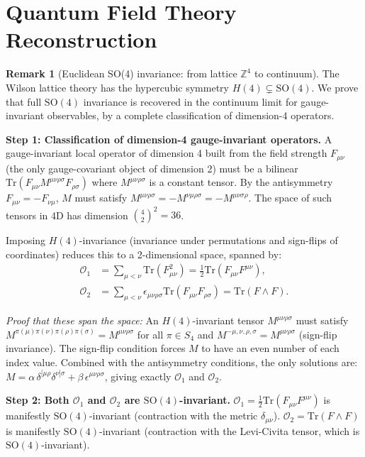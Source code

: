 \documentclass[11pt,a4paper]{amsart}
\theoremstyle{definition}
\newtheorem{remark}[theorem]{Remark}
\newcommand{\Z}{\mathbb{Z}}
\newcommand{\Tr}{\mathrm{Tr}}
\begin{document}
\section{Quantum Field Theory Reconstruction}
\label{sec:QFT_reconstruction}

\begin{remark}[Euclidean SO(4) invariance: from lattice $\Z^4$ to continuum]
\label{rem:euclidean_inv}
The Wilson lattice theory has the hypercubic symmetry $H(4) \subsetneq \mathrm{SO}(4)$.
We prove that full $\mathrm{SO}(4)$ invariance is recovered in the continuum limit
for gauge-invariant observables, by a complete classification of dimension-4 operators.

\textbf{Step 1: Classification of dimension-4 gauge-invariant operators.}
A gauge-invariant local operator of dimension 4 built from the field strength
$F_{\mu\nu}$ (the only gauge-covariant object of dimension 2) must be a bilinear
$\Tr(F_{\mu\nu} M^{\mu\nu\rho\sigma} F_{\rho\sigma})$ where
$M^{\mu\nu\rho\sigma}$ is a constant tensor.  By the antisymmetry
$F_{\mu\nu} = -F_{\nu\mu}$, $M$ must satisfy
$M^{\mu\nu\rho\sigma} = -M^{\nu\mu\rho\sigma} = -M^{\mu\nu\sigma\rho}$.
The space of such tensors in 4D has dimension $\binom{4}{2}^2 = 36$.

Imposing $H(4)$-invariance (invariance under permutations and sign-flips of
coordinates) reduces this to a 2-dimensional space, spanned by:
\begin{align}
  \mathcal{O}_1 &= \sum_{\mu<\nu}\Tr(F_{\mu\nu}^2) = \tfrac{1}{2}\Tr(F_{\mu\nu}F^{\mu\nu}), \label{eq:O1} \\
  \mathcal{O}_2 &= \sum_{\mu<\nu}\epsilon_{\mu\nu\rho\sigma}\Tr(F_{\mu\nu}F_{\rho\sigma})
  = \Tr(F \wedge F). \label{eq:O2}
\end{align}

\emph{Proof that these span the space:}
An $H(4)$-invariant tensor $M^{\mu\nu\rho\sigma}$ must satisfy
$M^{\pi(\mu)\pi(\nu)\pi(\rho)\pi(\sigma)} = M^{\mu\nu\rho\sigma}$
for all $\pi \in S_4$ and $M^{-\mu,\nu,\rho,\sigma} = M^{\mu\nu\rho\sigma}$
(sign-flip invariance).  The sign-flip condition forces $M$ to have an even
number of each index value.  Combined with the antisymmetry conditions, the
only solutions are: $M = \alpha\,\delta^{[\mu\rho}\delta^{\nu]\sigma}
+ \beta\,\epsilon^{\mu\nu\rho\sigma}$, giving exactly $\mathcal{O}_1$ and
$\mathcal{O}_2$.

\textbf{Step 2: Both $\mathcal{O}_1$ and $\mathcal{O}_2$ are $\mathrm{SO}(4)$-invariant.}
$\mathcal{O}_1 = \frac{1}{2}\Tr(F_{\mu\nu}F^{\mu\nu})$ is manifestly
$\mathrm{SO}(4)$-invariant (contraction with the metric $\delta_{\mu\nu}$).
$\mathcal{O}_2 = \Tr(F\wedge F)$ is manifestly $\mathrm{SO}(4)$-invariant
(contraction with the Levi-Civita tensor, which is $\mathrm{SO}(4)$-invariant).


\end{remark}
\end{document}
